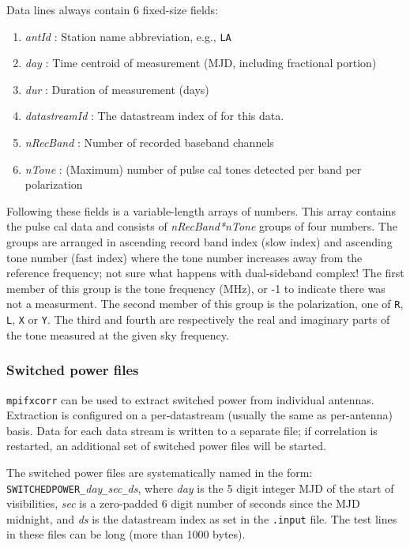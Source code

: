 Data lines always contain 6 fixed-size fields:
\begin{enumerate}
\item {\em antId} : Station name abbreviation, e.g., {\tt LA}
\item {\em day} : Time centroid of measurement (MJD, including fractional portion)
\item {\em dur} : Duration of measurement (days)
\item {\em datastreamId} : The datastream index of for this data.
\item {\em nRecBand} : Number of recorded baseband channels
\item {\em nTone} : (Maximum) number of pulse cal tones detected per band per polarization
\end{enumerate}
Following these fields is a variable-length arrays of numbers.
This array contains the pulse cal data and consists of {\em nRecBand*nTone} groups of four numbers.
The groups are arranged in ascending record band index (slow index) and ascending tone number (fast index) where the tone number increases away from the reference frequency; not sure what happens with dual-sideband complex!
The first member of this group is the tone frequency (MHz), or -1 to indicate there was not a measurment.
The second member of this group is the polarization, one of {\tt R}, {\tt L}, {\tt X} or {\tt Y}.
The third and fourth are respectively the real and imaginary parts of the tone measured at the given sky frequency.


\subsubsection{Switched power files} \label{sec:difxswitchedpower}

{\tt mpifxcorr} can be used to extract switched power from individual antennas.
Extraction is configured on a per-datastream (usually the same as per-antenna) basis.
Data for each data stream is written to a separate file; if correlation is restarted, an additional set of switched power files will be started.

The switched power files are systematically named in the form: {\tt SWITCHEDPOWER\_}{\em day}{\tt \_}{\em sec}{\tt \_}{\em ds}, where {\em day} is the 5 digit integer MJD of the start of visibilities, {\em sec} is a zero-padded 6 digit number of seconds since the MJD midnight, and {\em ds} is the datastream index as set in the {\tt .input} file.
The test lines in these files can be long (more than 1000 bytes).

